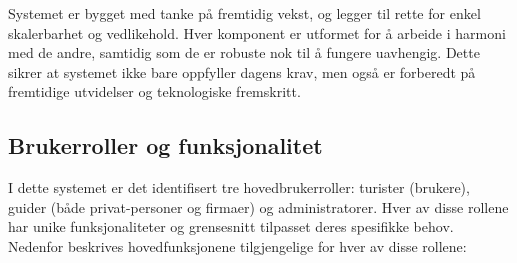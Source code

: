 \documentclass[../doc.tex]{subfiles}
\begin{document}
Systemet er bygget med tanke på fremtidig vekst, og legger til rette for enkel skalerbarhet og vedlikehold. 
Hver komponent er utformet for å arbeide i harmoni med de andre, samtidig som de er robuste nok til å fungere uavhengig. 
Dette sikrer at systemet ikke bare oppfyller dagens krav, men også er forberedt på fremtidige utvidelser og teknologiske fremskritt.

\subsection{Brukerroller og funksjonalitet}
I dette systemet er det identifisert tre hovedbrukerroller: turister (brukere), guider (både privat-personer og firmaer) og administratorer. Hver av disse rollene har unike funksjonaliteter og grensesnitt tilpasset deres spesifikke behov. Nedenfor beskrives hovedfunksjonene tilgjengelige for hver av disse rollene:
\end{document}
